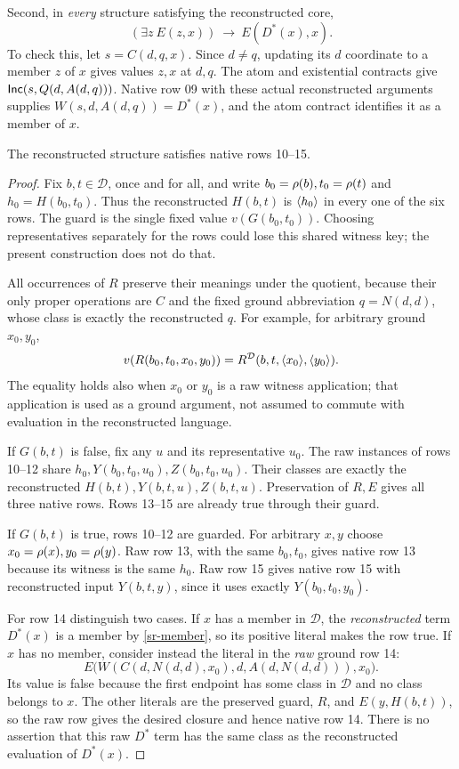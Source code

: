 Second, in \emph{every} structure satisfying the reconstructed core,
\begin{equation}\label{sr-member}
(\exists z\ E(z,x))\ \longrightarrow\ E(D^*(x),x).
\end{equation}
To check this, let $s=C(d,q,x)$. Since $d\ne q$, updating its $d$ coordinate
to a member $z$ of $x$ gives values $z,x$ at $d,q$. The atom and existential
contracts give $\mathsf{Inc}(s,Q(d,A(d,q)))$. Native row 09 with these actual
reconstructed arguments supplies $W(s,d,A(d,q))=D^*(x)$, and the atom
contract identifies it as a member of $x$.

\begin{srlemma}\label{sr-closure}
The reconstructed structure satisfies native rows 10--15.
\end{srlemma}
\begin{proof}
Fix $b,t\in\mathcal D$, once and for all, and write
$b_0=\rho(b),t_0=\rho(t)$ and $h_0=H(b_0,t_0)$. Thus the reconstructed
$H(b,t)$ is $\langle h_0\rangle$ in every one of the six rows. The guard is the
single fixed value $v(G(b_0,t_0))$. Choosing representatives separately for
the rows could lose this shared witness key; the present construction does
not do that.

All occurrences of $R$ preserve their meanings under the quotient, because
their only proper operations are $C$ and the fixed ground abbreviation
$q=N(d,d)$, whose class is exactly the reconstructed $q$. For example, for
arbitrary ground $x_0,y_0$,
\[
v(R(b_0,t_0,x_0,y_0))
 =R^{\mathcal D}(b,t,\langle x_0\rangle,\langle y_0\rangle).
\]
The equality holds also when $x_0$ or $y_0$ is a raw witness application;
that application is used as a ground argument, not assumed to commute with
evaluation in the reconstructed language.

If $G(b,t)$ is false, fix any $u$ and its representative $u_0$. The raw
instances of rows 10--12 share $h_0,Y(b_0,t_0,u_0),Z(b_0,t_0,u_0)$. Their
classes are exactly the reconstructed $H(b,t),Y(b,t,u),Z(b,t,u)$.
Preservation of $R,E$ gives all three native rows. Rows 13--15 are already
true through their guard.

If $G(b,t)$ is true, rows 10--12 are guarded. For arbitrary $x,y$ choose
$x_0=\rho(x),y_0=\rho(y)$. Raw row 13, with the same $b_0,t_0$, gives
native row 13 because its witness is the same $h_0$. Raw row 15 gives
native row 15 with reconstructed input $Y(b,t,y)$, since it uses exactly
$Y(b_0,t_0,y_0)$.

For row 14 distinguish two cases. If $x$ has a member in $\mathcal D$,
the \emph{reconstructed} term $D^*(x)$ is a member by
\eqref{sr-member}, so its positive literal makes the row true. If $x$ has
no member, consider instead the literal in the \emph{raw} ground row 14:
\[
E\bigl(W(C(d,N(d,d),x_0),d,A(d,N(d,d))),x_0\bigr).
\]
Its value is false because the first endpoint has some class in
$\mathcal D$ and no class belongs to $x$. The other literals are the
preserved guard, $R$, and $E(y,H(b,t))$, so the raw row gives the desired
closure and hence native row 14. There is no assertion that this raw
$D^*$ term has the same class as the reconstructed evaluation of $D^*(x)$.
\end{proof}

